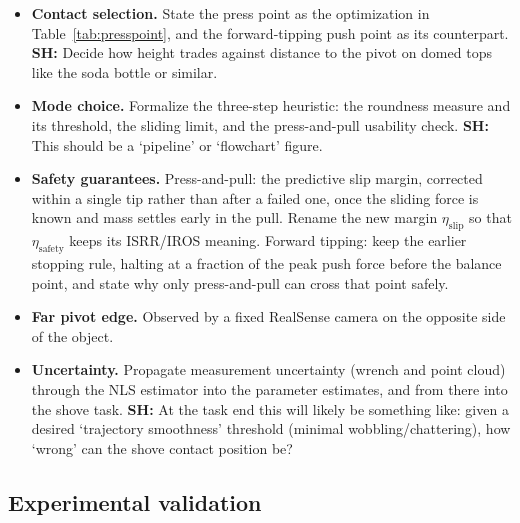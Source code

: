 \documentclass[10pt, conference]{IEEEtran}
\newcommand{\sh}[1]{\textcolor{orange!90!black}{\textbf{SH:} #1}}
\begin{document}
\begin{itemize}[leftmargin=*, itemsep=2pt]
  \item \textbf{Contact selection.} State the press point as the optimization in Table~\ref{tab:presspoint}, and the forward-tipping push point as its counterpart. \sh{Decide how height trades against distance to the pivot on domed tops like the soda bottle or similar.}
  \item \textbf{Mode choice.} Formalize the three-step heuristic: the roundness measure and its threshold, the sliding limit, and the press-and-pull usability check. \sh{This should be a `pipeline' or `flowchart' figure.}
  \item \textbf{Safety guarantees.} Press-and-pull: the predictive slip margin, corrected within a single tip rather than after a failed one, once the sliding force is known and mass settles early in the pull. Rename the new margin $\eta_{\mathrm{slip}}$ so that $\eta_{\mathrm{safety}}$ keeps its ISRR/IROS meaning. Forward tipping: keep the earlier stopping rule, halting at a fraction of the peak push force before the balance point, and state why only press-and-pull can cross that point safely.
  \item \textbf{Far pivot edge.} Observed by a fixed RealSense camera on the opposite side of the object.
  \item \textbf{Uncertainty.} Propagate measurement uncertainty (wrench and point cloud) through the NLS estimator into the parameter estimates, and from there into the shove task. \sh{At the task end this will likely be something like: given a desired `trajectory smoothness' threshold (minimal wobbling/chattering), how `wrong' can the shove contact position be?}
\end{itemize}

\subsection{Experimental validation}
\end{document}
